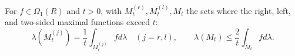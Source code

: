 For $f \in \Omega_1(R)$ and $t > 0$, with $M_t^{(r)}, M_t^{(l)}, M_t$ the sets where the right, left, and two-sided maximal functions exceed $t$:
$$\lambda(M_t^{(j)}) = \frac{1}{t} \int_{M_t^{(j)}} f d\lambda \quad (j=r,l), \qquad \lambda(M_t) \leq \frac{2}{t} \int_{M_t} f d\lambda.$$
